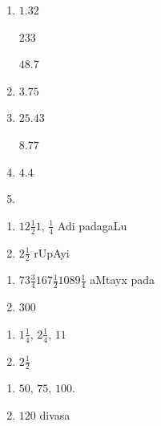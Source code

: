 
\begin{multicols}{3}
\begin{enumerate}[$(1)$]
\item $1.32$

      $233$

      $48.7$
\item $3.75$
      
\item $25.43$

      $8.77$
\item $4.4$
\item[]
\end{enumerate}
\end{multicols}


\begin{multicols}{2}
\begin{enumerate}[$(1)$]
\item $12\frac{1}{2}1$, $\frac{1}{4}$ Adi padagaLu
\item $2 \frac{1}{2}$ rUpAyi
\end{enumerate}
\end{multicols}


\begin{multicols}{2}
\begin{enumerate}[$(1)$]
\item $73\frac{3}{4} 167 \frac{1}{2} 1089 \frac{1}{4}$ aMtayx pada
\item $300$
\end{enumerate}
\end{multicols}


\begin{multicols}{2}
\begin{enumerate}[$(1)$]
\item $1\frac{1}{4}$, $2 \frac{1}{4}$, $11$ 
\item $2\frac{1}{2}$
\end{enumerate}
\end{multicols}


\begin{multicols}{2}
\begin{enumerate}[$(1)$]
\item $50$, $75$, $100$.
\item $120$ divasa
\end{enumerate}
\end{multicols}

